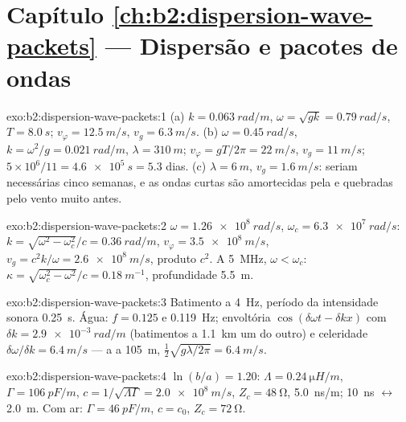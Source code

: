\section*{Capítulo \ref{ch:b2:dispersion-wave-packets} --- Dispersão e pacotes de ondas}

\begin{solution}{exo:b2:dispersion-wave-packets:1}
(a) $k = \qty{0.063}{rad/m}$, $\omega = \sqrt{gk} = \qty{0.79}{rad/s}$, $T = \qty{8.0}{s}$;
$v_\varphi = \qty{12.5}{m/s}$, $v_g = \qty{6.3}{m/s}$. (b) $\omega = \qty{0.45}{rad/s}$, $k = \omega^2
/g = \qty{0.021}{rad/m}$, $\lambda = \qty{310}{m}$; $v_\varphi = gT/2\pi = \qty{22}{m/s}$, $v_g =
\qty{11}{m/s}$; $5 \times 10^6/11 = \qty{4.6e5}{s} = 5.3$ dias. (c) $\lambda = \qty{6}{m}$, $v_g
= \qty{1.6}{m/s}$: seriam necessárias cinco semanas, e as ondas curtas são amortecidas
pela  e quebradas pelo vento muito antes.
\end{solution}

\begin{solution}{exo:b2:dispersion-wave-packets:2}
$\omega = \qty{1.26e8}{rad/s}$, $\omega_c = \qty{6.3e7}{rad/s}$: $k = \sqrt{\omega^2 - \omega_c^2}/c =
\qty{0.36}{rad/m}$, $v_\varphi = \qty{3.5e8}{m/s}$, $v_g = c^2k/\omega = \qty{2.6e8}{m/s}$,
produto $c^2$. A \qty{5}{MHz}, $\omega < \omega_c$: $\kappa = \sqrt{\omega_c^2 - \omega^2}/c =
\qty{0.18}{m^{-1}}$, profundidade \qty{5.5}{m}.
\end{solution}

\begin{solution}{exo:b2:dispersion-wave-packets:3}
Batimento a \qty{4}{Hz}, período da intensidade sonora \qty{0.25}{s}. Água: $f = 0.125$ e
\qty{0.119}{Hz}; envoltória $\cos(\delta\omega t - \delta kx)$ com $\delta k = \qty{2.9e-3}{rad/m}$
(batimentos a \qty{1.1}{km} um do outro) e celeridade $\delta\omega/\delta k = \qty{6.4}{m/s}$ --- a
 a \qty{105}{m}, $\tfrac12\sqrt{g\lambda/2\pi} = \qty{6.4}{m/s}$.
\end{solution}

\begin{solution}{exo:b2:dispersion-wave-packets:4}
$\ln(b/a) = 1.20$: $\Lambda = \qty{0.24}{\micro H/m}$, $\Gamma = \qty{106}{pF/m}$, $c = 1/
\sqrt{\Lambda\Gamma} = \qty{2.0e8}{m/s}$, $Z_c = \qty{48}{\ohm}$, \qty{5.0}{ns/m}; \qty{10}{ns}
$\leftrightarrow$ \qty{2.0}{m}. Com ar: $\Gamma = \qty{46}{pF/m}$, $c = c_0$, $Z_c = \qty{72}{\ohm}$.
\end{solution}

